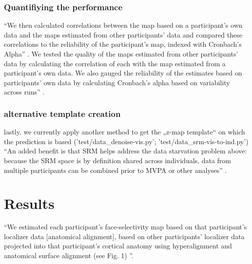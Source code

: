 \subsubsection{Quantifiying the performance}

``We then calculated correlations between the map based on a participant’s own
data and the maps estimated from other participants' data and compared these
correlations to the reliability of the participant's map, indexed with
Cronbach's Alpha'' \citep{jiahui2020predicting}.
%
We tested the quality of the maps estimated from other participants' data by
calculating the correlation of each with the map estimated from a participant's
own data. We also gauged the reliability of the estimates based on
participants' own data by calculating Cronbach's alpha based on variability
across runs'' \citep{jiahui2020predicting}.


\subsubsection{alternative template creation}
%
lastly, we currently apply another method to get the „z-map template“ on which
the prediction is based ('test/data\_denoise-vis.py';
'test/data\_srm-vis-to-ind.py')
%
``An added benefit is that SRM helps address the data starvation problem above:
because the SRM space is by definition shared across individuals, data from
multiple participants can be combined prior to MVPA or other analyses''
\citep{cohen2017computational}.


\section{Results}





``We estimated each participant's face-selectivity map based on that
participant’s localizer data [anatomical alignment], based on other
participants' localizer data projected into that participant's cortical anatomy
using hyperalignment and anatomical surface alignment (see Fig. 1) \citep{jiahui2020predicting}''.

